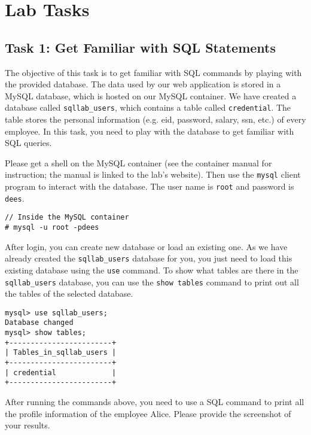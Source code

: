 \section{Lab Tasks}



\subsection{Task 1: Get Familiar with SQL Statements}
\label{ssec:MySQLConsole}


The objective of this task is to get familiar with SQL commands by playing
with the provided database. The data used by our web application
is stored in a MySQL database, which is hosted on our 
MySQL container. 
We have created a database called \texttt{sqllab\_users},
which contains a table called {\tt credential}. The table stores
the personal information (e.g. eid, password, salary, ssn, etc.) of every
employee. In this task, you need to play with the database to get familiar
with SQL queries.

Please get a shell on the MySQL container (see the container manual for 
instruction; the manual is linked to the lab's website).
Then use the \texttt{mysql} client program to 
interact with the database. 
The user name is {\tt root} and password is {\tt dees}.  

	
\begin{lstlisting}
// Inside the MySQL container
# mysql -u root -pdees 
\end{lstlisting}


After login, you can create new database or load an existing
one. As we have already created the \texttt{sqllab\_users} database for you, you just
need to load this existing database using the \texttt{use} command. 
To show what tables are there in the \texttt{sqllab\_users} database, 
you can use the \texttt{show tables} command to print out all the tables of the
selected database.

\begin{lstlisting}
mysql> use sqllab_users;
Database changed
mysql> show tables;
+------------------------+
| Tables_in_sqllab_users |
+------------------------+
| credential             |
+------------------------+
\end{lstlisting}


After running the commands above, you need to use 
a SQL command to print all the profile information of
the employee Alice. Please provide the screenshot of your results.


